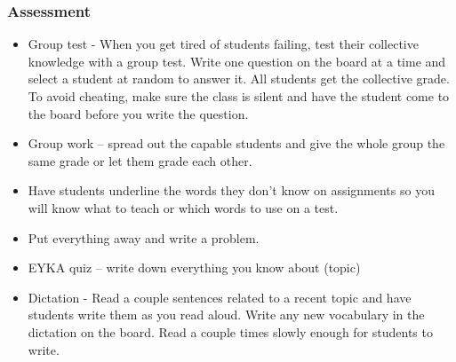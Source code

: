 \documentclass[12pt,a4paper]{report}
\begin{document}
\subsubsection{Assessment}
\begin{itemize}
\item{Group test - When you get tired of students failing, test their collective knowledge with a group test. Write one question on the board at a time and select a student at random to answer it. All students get the collective grade. To avoid cheating, make sure the class is silent and have the student come to the board before you write the question.}

\item{Group work – spread out the capable students and give the whole group the same grade or let them grade each other.}

\item{Have students underline the words they don’t know on assignments so you will know what to teach or which words to use on a test.}

\item{Put everything away and write a problem.}

\item{EYKA quiz – write down everything you know about (topic)}

\item{Dictation - Read a couple sentences related to a recent topic and have students write them as you read aloud. Write any new vocabulary in the dictation on the board. Read a couple times slowly enough for students to write.}

\end{itemize}
\end{document}
